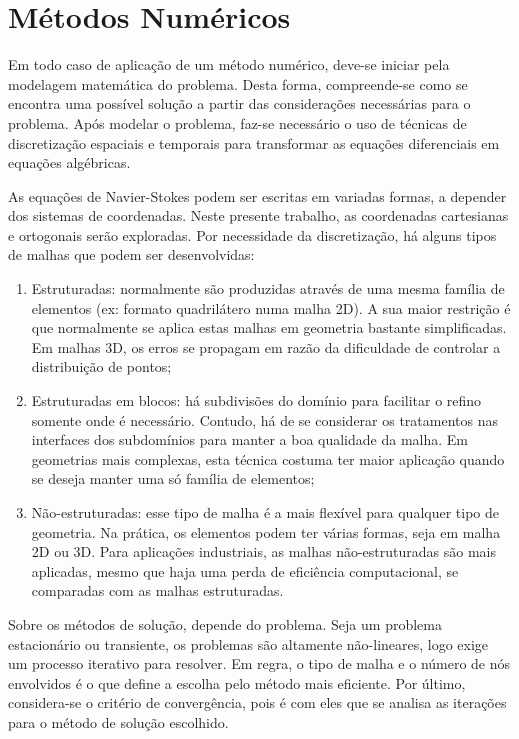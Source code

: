 \chapter{Métodos Numéricos}\label{cap:metodos-numericos}
\graphicspath{{chapter-03/img-cap03/}}

Em todo caso de aplicação de um método numérico, deve-se iniciar pela modelagem matemática do problema. Desta forma, compreende-se como se encontra uma possível solução a partir das considerações necessárias para o problema. Após modelar o problema, faz-se necessário o uso de técnicas de discretização espaciais e temporais para transformar as equações diferenciais em equações algébricas.

As equações de Navier-Stokes podem ser escritas em variadas formas, a depender dos sistemas de coordenadas. Neste presente trabalho, as coordenadas cartesianas e ortogonais serão exploradas. Por necessidade da discretização, há alguns tipos de malhas que podem ser desenvolvidas: 

\begin{enumerate}
    \item Estruturadas: normalmente são produzidas através de uma mesma família de elementos (ex: formato quadrilátero numa malha 2D). A sua maior restrição é que normalmente se aplica estas malhas em geometria bastante simplificadas. Em malhas 3D, os erros se propagam em razão da dificuldade de controlar a distribuição de pontos;
    \item Estruturadas em blocos: há subdivisões do domínio para facilitar o refino somente onde é necessário. Contudo, há de se considerar os tratamentos nas interfaces dos subdomínios para manter a boa qualidade da malha. Em geometrias mais complexas, esta técnica costuma ter maior aplicação quando se deseja manter uma só família de elementos;
    \item Não-estruturadas: esse tipo de malha é a mais flexível para qualquer tipo de geometria. Na prática, os elementos podem ter várias formas, seja em malha 2D ou 3D. Para aplicações industriais, as malhas não-estruturadas são mais aplicadas, mesmo que haja uma perda de eficiência computacional, se comparadas com as malhas estruturadas.
\end{enumerate}

Sobre os métodos de solução, depende do problema. Seja um problema estacionário ou transiente, os problemas são altamente não-lineares, logo exige um processo iterativo para resolver. Em regra, o tipo de malha e o número de nós envolvidos é o que define a escolha pelo método mais eficiente. Por último, considera-se o critério de convergência, pois é com eles que se analisa as iterações para o método de solução escolhido. 

